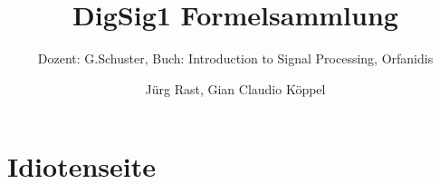 \documentclass{scrartcl}
\title{DigSig1 Formelsammlung}
\subtitle{Dozent: G.Schuster, Buch: Introduction to Signal Processing, Orfanidis}
\author{Jürg Rast, Gian Claudio Köppel}
\begin{document}
\begin{titlepage}
	\maketitle
	\thispagestyle{empty}
\end{titlepage}
\newpage

\tableofcontents
\newpage









\section{Idiotenseite}









\end{document}
